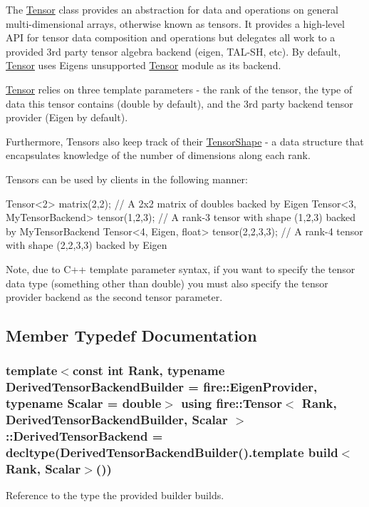 The \hyperlink{a00046}{Tensor} class provides an abstraction for data and operations on general multi-\/dimensional arrays, otherwise known as tensors. It provides a high-\/level A\+P\+I for tensor data composition and operations but delegates all work to a provided 3rd party tensor algebra backend (eigen, T\+A\+L-\/\+S\+H, etc). By default, \hyperlink{a00046}{Tensor} uses Eigen\textquotesingle{}s unsupported \hyperlink{a00046}{Tensor} module as its backend.

\hyperlink{a00046}{Tensor} relies on three template parameters -\/ the rank of the tensor, the type of data this tensor contains (double by default), and the 3rd party backend tensor provider (Eigen by default).

Furthermore, Tensors also keep track of their \hyperlink{a00048}{Tensor\+Shape} -\/ a data structure that encapsulates knowledge of the number of dimensions along each rank.

Tensors can be used by clients in the following manner\+:


\begin{DoxyCode}
Tensor<2> matrix(2,2); \textcolor{comment}{// A 2x2 matrix of doubles backed by Eigen}
Tensor<3, MyTensorBackend> tensor(1,2,3); \textcolor{comment}{// A rank-3 tensor with shape (1,2,3) backed by MyTensorBackend}
Tensor<4, Eigen, float> tensor(2,2,3,3); \textcolor{comment}{// A rank-4 tensor with shape (2,2,3,3) backed by Eigen}
\end{DoxyCode}


Note, due to C++ template parameter syntax, if you want to specify the tensor data type (something other than double) you must also specify the tensor provider backend as the second tensor parameter. 

\subsection{Member Typedef Documentation}
\hypertarget{a00046_a2bee8cbb535647595a650d9a48edb509}{}
\subsubsection[{Derived\+Tensor\+Backend}]{\setlength{\rightskip}{0pt plus 5cm}template$<$const int Rank, typename Derived\+Tensor\+Backend\+Builder = fire\+::\+Eigen\+Provider, typename Scalar = double$>$ using {\bf fire\+::\+Tensor}$<$ Rank, Derived\+Tensor\+Backend\+Builder, Scalar $>$\+::{\bf Derived\+Tensor\+Backend} =  decltype(Derived\+Tensor\+Backend\+Builder().template {\bf build}$<$Rank, Scalar$>$())\hspace{0.3cm}{\ttfamily [protected]}}\label{a00046_a2bee8cbb535647595a650d9a48edb509}
Reference to the type the provided builder builds. \hypertarget{a00046_ac86105ceb5e209854b2554a755024bd4}{}
